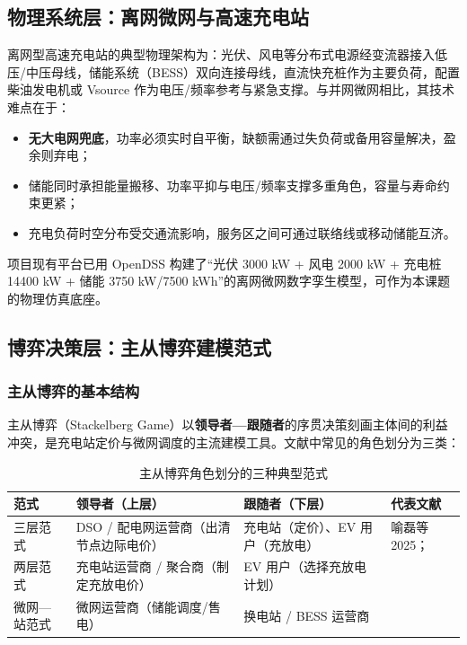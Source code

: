 \documentclass[UTF8,a4paper,11pt]{ctexart}
\begin{document}
\subsection{物理系统层：离网微网与高速充电站}
离网型高速充电站的典型物理架构为：光伏、风电等分布式电源经变流器接入低压/中压母线，储能系统（BESS）双向连接母线，直流快充桩作为主要负荷，配置柴油发电机或 Vsource 作为电压/频率参考与紧急支撑。与并网微网相比，其技术难点在于：
\begin{itemize}
  \item \textbf{无大电网兜底}，功率必须实时自平衡，缺额需通过失负荷或备用容量解决，盈余则弃电；
  \item 储能同时承担能量搬移、功率平抑与电压/频率支撑多重角色，容量与寿命约束更紧；
  \item 充电负荷时空分布受交通流影响，服务区之间可通过联络线或移动储能互济。
\end{itemize}
项目现有平台已用 OpenDSS 构建了“光伏 3000 kW + 风电 2000 kW + 充电桩 14400 kW + 储能 3750 kW/7500 kWh”的离网微网数字孪生模型，可作为本课题的物理仿真底座。

\subsection{博弈决策层：主从博弈建模范式}
\subsubsection{主从博弈的基本结构}
主从博弈（Stackelberg Game）以\textbf{领导者—跟随者}的序贯决策刻画主体间的利益冲突，是充电站定价与微网调度的主流建模工具。文献中常见的角色划分为三类：

\begin{table}[htbp]
\centering
\small
\caption{主从博弈角色划分的三种典型范式}
\begin{tabular}{p{2.4cm} p{4.2cm} p{4.2cm} p{3.6cm}}
\toprule
\textbf{范式} & \textbf{领导者（上层）} & \textbf{跟随者（下层）} & \textbf{代表文献}\\
\midrule
三层范式 & DSO / 配电网运营商（出清节点边际电价） & 充电站（定价）、EV 用户（充放电） & 喻磊等 2025\cite{ref1}；\\
两层范式 & 充电站运营商 / 聚合商（制定充放电价） & EV 用户（选择充放电计划） & \cite{ref2,ref3,ref9}\\
微网—站范式 & 微网运营商（储能调度/售电） & 换电站 / BESS 运营商 & \cite{ref7}\\
\bottomrule
\end{tabular}
\end{table}
\end{document}
